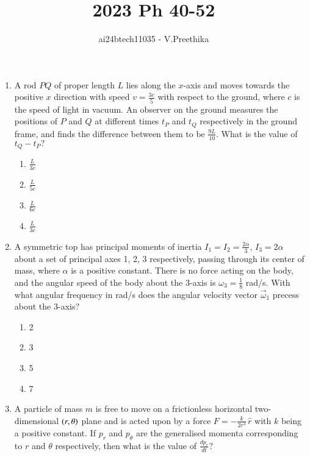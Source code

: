 \documentclass[journal]{IEEEtran}
\begin{document}

\vspace{3cm}

\title{2023 Ph 40-52}
\author{ai24btech11035 - V.Preethika}
\maketitle
\bigskip

\renewcommand{\thefigure}{\theenumi}
\renewcommand{\thetable}{\theenumi}
\begin{enumerate}
\item A rod $PQ$ of proper length $L$ lies along the $x$-axis and moves towards the positive $x$ direction with speed $v = \frac{3c}{5}$ with respect to the ground, where $c$ is the speed of light in vacuum. An observer on the ground measures the positions of $P$ and $Q$ at different times $t_P$ and $t_Q$ respectively in the ground frame, and finds the difference between them to be $\frac{9L}{10}$. What is the value of $t_Q - t_P?$
\begin{enumerate}
\item $\frac{L}{3c}$
\item $\frac{L}{5c}$
\item $\frac{L}{6c}$
\item $\frac{L}{3c}$
\end{enumerate}
\item A symmetric top has principal moments of inertia $I_1 = I_2 = \frac{2\alpha}{3}$, $I_3 = 2\alpha$ about a set of principal axes 1, 2, 3 respectively, passing through its center of mass, where $\alpha$ is a positive constant. There is no force acting on the body, and the angular speed of the body about the 3-axis is $\omega_3 = \frac{1}{8}$ rad/s. With what angular frequency in rad/s does the angular velocity vector $\vec{\omega}_1$ precess about the 3-axis?
\begin{enumerate}
\item 2
\item 3
\item 5
\item 7
\end{enumerate}
\item A particle of mass $m$ is free to move on a frictionless horizontal two-dimensional $\left(r, \theta\right)$ plane and is acted upon by a force $F = -\frac{k}{2r^3} \, \hat{r}$ with $k$ being a positive constant. If $p_r$ and $p_\theta$ are the generalised momenta corresponding to $r$ and $\theta$ respectively, then what is the value of $\frac{dp_r}{dt}?$
\begin{enumerate}

\end{enumerate}
\end{enumerate}
\end{document}
